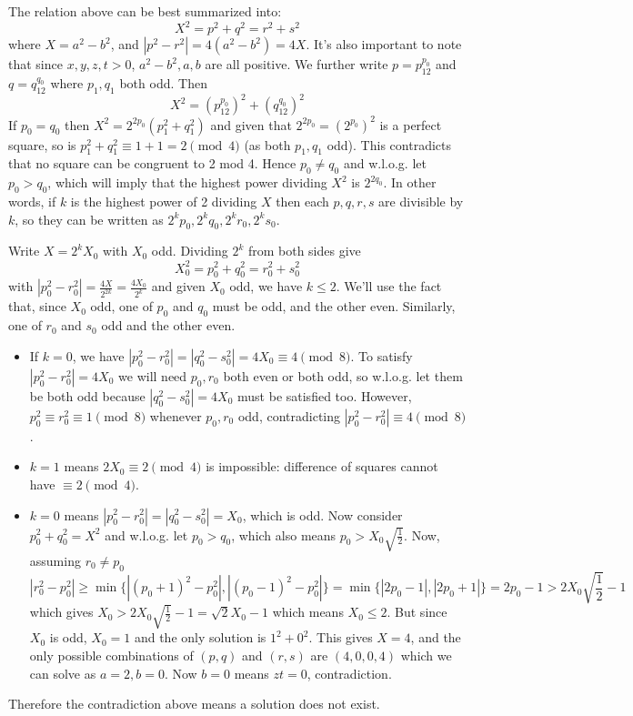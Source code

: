 \documentclass[11pt,a4paper]{article}
\begin{document}
\begin{enumerate}
	The relation above can be best summarized into: 
	\[
	X^2=p^2+q^2=r^2+s^2
	\]
	where $X=a^2-b^2$, and $|p^2-r^2|=4(a^2-b^2)=4X$. 
	It's also important to note that since $x, y, z, t>0$, $a^2-b^2, a, b$ are all positive. 
	We further write $p=p_12^{p_0}$ and $q=q_12^{q_0}$ where $p_1, q_1$ both odd. Then 
	\[
	X^2=(p_12^{p_0})^2+(q_12^{q_0})^2
	\]
	If $p_0=q_0$ then $X^2=2^{2p_0}(p_1^2+q_1^2)$ and given that $2^{2p_0}=(2^{p_0})^2$ is a perfect square, so is $p_1^2+q_1^2\equiv 1+1=2\pmod{4}$ (as both $p_1, q_1$ odd). This contradicts that no square can be congruent to 2 mod 4. Hence $p_0\neq q_0$ and w.l.o.g. let $p_0>q_0$, which will imply that the highest power dividing $X^2$ is $2^{2q_0}$. In other words, if $k$ is the highest power of 2 dividing $X$ then each $p, q, r, s$ are divisible by $k$, so they can be written as $2^kp_0, 2^kq_0, 2^kr_0, 2^ks_0$. 
	
	Write $X=2^kX_0$ with $X_0$ odd. Dividing $2^k$ from both sides give 
	\[
	X_0^2=p_0^2+q_0^2=r_0^2+s_0^2
	\]
	with $|p_0^2-r_0^2|=\frac{4X}{2^{2k}}=\frac{4X_0}{2^k}$ and given $X_0$ odd, we have $k\le 2$. We'll use the fact that, since $X_0$ odd, one of $p_0$ and $q_0$ must be odd, and the other even. Similarly, one of $r_0$ and $s_0$ odd and the other even. 
	
	\begin{itemize}
		\item If $k=0$, we have $|p_0^2-r_0^2|=|q_0^2-s_0^2|=4X_0\equiv 4\pmod{8}$. 
		To satisfy $|p_0^2-r_0^2|=4X_0$ we will need $p_0, r_0$ both even or both odd, so w.l.o.g. let them be both odd because $|q_0^2-s_0^2|=4X_0$ must be satisfied too. 
		However, $p_0^2\equiv r_0^2\equiv 1\pmod{8}$ whenever $p_0, r_0$ odd, contradicting $|p_0^2-r_0^2|\equiv 4\pmod{8}$. 
		
		\item $k=1$ means $2X_0\equiv 2\pmod{4}$ is impossible: difference of squares cannot have $\equiv 2\pmod{4}$. 
		\item $k=0$ means $|p_0^2-r_0^2|=|q_0^2-s_0^2|=X_0$, which is odd. Now consider $p_0^2+q_0^2=X^2$ and w.l.o.g. let $p_0>q_0$, which also means $p_0>X_0\sqrt{\frac{1}{2}}$. 
		Now, assuming $r_0\neq p_0$
		\[
		|r_0^2-p_0^2|\ge\min\{|(p_0+1)^2-p_0^2|, |(p_0-1)^2-p_0^2|\}=\min\{|2p_0-1|, |2p_0+1|\}=2p_0-1
		>2X_0\sqrt{\frac{1}{2}}-1
		\]
		which gives $X_0>2X_0\sqrt{\frac{1}{2}}-1=\sqrt{2}X_0-1$ which means $X_0\le 2$. But since $X_0$ is odd, $X_0=1$ and the only solution is $1^2+0^2$. This gives $X=4$, and the only possible combinations of $(p, q)$ and $(r, s)$ are $(4, 0, 0, 4)$ which we can solve as $a=2, b=0$. Now $b=0$ means $zt=0$, contradiction. 
	\end{itemize}
	Therefore the contradiction above means a solution does not exist. 
	

\end{enumerate}
\end{document}
